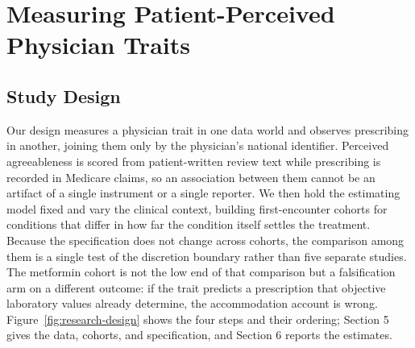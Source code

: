 
\section{Measuring Patient-Perceived Physician Traits}

\subsection{Study Design}
Our design measures a physician trait in one data world and observes prescribing in another, joining them only by the physician's national identifier. Perceived agreeableness is scored from patient-written review text while prescribing is recorded in Medicare claims, so an association between them cannot be an artifact of a single instrument or a single reporter. We then hold the estimating model fixed and vary the clinical context, building first-encounter cohorts for conditions that differ in how far the condition itself settles the treatment. Because the specification does not change across cohorts, the comparison among them is a single test of the discretion boundary rather than five separate studies. The metformin cohort is not the low end of that comparison but a falsification arm on a different outcome: if the trait predicts a prescription that objective laboratory values already determine, the accommodation account is wrong. Figure~\ref{fig:research-design} shows the four steps and their ordering; Section 5 gives the data, cohorts, and specification, and Section 6 reports the estimates.


